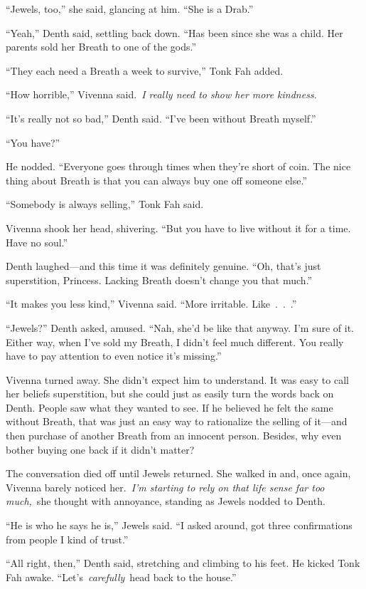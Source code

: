 “Jewels, too,” she said, glancing at him. “She is a Drab.”

“Yeah,” Denth said, settling back down. “Has been since she was a child. Her parents sold her Breath to one of the gods.”

“They each need a Breath a week to survive,” Tonk Fah added.

“How horrible,” Vivenna said.~\textit{I really need to show her more kindness.}

“It’s really not so bad,” Denth said. “I’ve been without Breath myself.”

“You have?”

He nodded. “Everyone goes through times when they’re short of coin. The nice thing about Breath is that you can always buy one off someone else.”

“Somebody is always selling,” Tonk Fah said.

Vivenna shook her head, shivering. “But you have to live without it for a time. Have no soul.”

Denth laughed—and this time it was definitely genuine. “Oh, that’s just superstition, Princess. Lacking Breath doesn’t change you that much.”

“It makes you less kind,” Vivenna said. “More irritable. Like~.~.~.”

“Jewels?” Denth asked, amused. “Nah, she’d be like that anyway. I’m sure of it. Either way, when I’ve sold my Breath, I didn’t feel much different. You really have to pay attention to even notice it’s missing.”

Vivenna turned away. She didn’t expect him to understand. It was easy to call her beliefs superstition, but she could just as easily turn the words back on Denth. People saw what they wanted to see. If he believed he felt the same without Breath, that was just an easy way to rationalize the selling of it—and then purchase of another Breath from an innocent person. Besides, why even bother buying one back if it didn’t matter?

The conversation died off until Jewels returned. She walked in and, once again, Vivenna barely noticed her.~\textit{I’m starting to rely on that life sense far too much,}~she thought with annoyance, standing as Jewels nodded to Denth.

“He is who he says he is,” Jewels said. “I asked around, got three confirmations from people I kind of trust.”

“All right, then,” Denth said, stretching and climbing to his feet. He kicked Tonk Fah awake. “Let’s~\textit{carefully}~head back to the house.”


